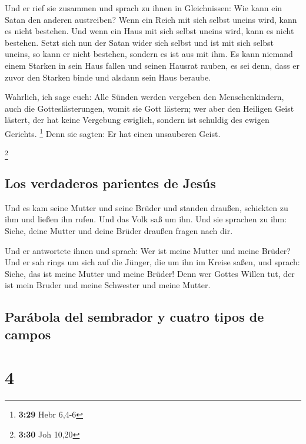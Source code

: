 Und er rief sie zusammen und sprach zu ihnen in
Gleichnissen: Wie kann ein Satan den anderen austreiben? 
Wenn ein Reich mit sich selbst uneins wird, kann es nicht bestehen.
 Und wenn ein Haus mit sich selbst uneins wird, kann es
nicht bestehen.  Setzt sich nun der Satan wider sich
selbst und ist mit sich selbst uneins, so kann er nicht bestehen,
sondern es ist aus mit ihm.  Es kann niemand einem
Starken in sein Haus fallen und seinen Hausrat rauben, es sei denn, dass
er zuvor den Starken binde und alsdann sein Haus beraube.

 Wahrlich, ich sage euch: Alle Sünden werden vergeben den
Menschenkindern, auch die Gotteslästerungen, womit sie Gott lästern;
 wer aber den Heiligen Geist lästert, der hat keine
Vergebung ewiglich, sondern ist schuldig des ewigen Gerichts.
\footnote{\textbf{3:29} Hebr 6,4-6}  Denn sie sagten: Er
hat einen unsauberen Geist.

\footnote{\textbf{3:30} Joh 10,20}

\hypertarget{los-verdaderos-parientes-de-jesuxfas}{%
\subsection{Los verdaderos parientes de
Jesús}\label{los-verdaderos-parientes-de-jesuxfas}}

 Und es kam seine Mutter und seine Brüder und standen
draußen, schickten zu ihm und ließen ihn rufen.  Und das
Volk saß um ihn. Und sie sprachen zu ihm: Siehe, deine Mutter und deine
Brüder draußen fragen nach dir.

 Und er antwortete ihnen und sprach: Wer ist meine Mutter
und meine Brüder?  Und er sah rings um sich auf die
Jünger, die um ihn im Kreise saßen, und sprach: Siehe, das ist meine
Mutter und meine Brüder!  Denn wer Gottes Willen tut, der
ist mein Bruder und meine Schwester und meine Mutter.

\hypertarget{paruxe1bola-del-sembrador-y-cuatro-tipos-de-campos}{%
\subsection{Parábola del sembrador y cuatro tipos de
campos}\label{paruxe1bola-del-sembrador-y-cuatro-tipos-de-campos}}

\hypertarget{section-3}{%
\section{4}\label{section-3}}

